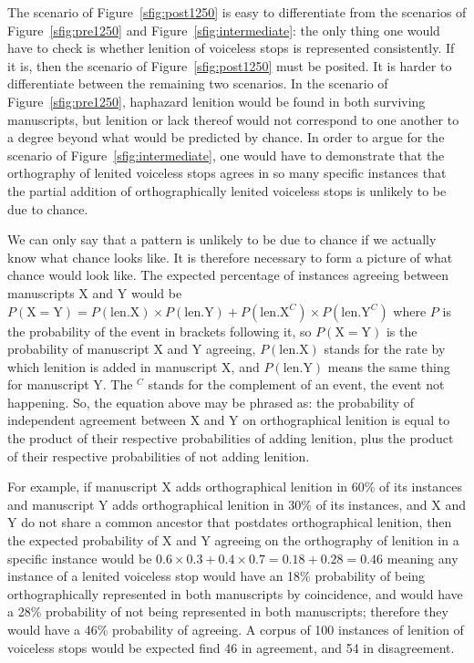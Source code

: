 The scenario of Figure~\ref{sfig:post1250} is easy to differentiate from the scenarios of Figure~\ref{sfig:pre1250} and Figure~\ref{sfig:intermediate}: the only thing one would have to check is whether lenition of voiceless stops is represented consistently. If it is, then the scenario of Figure~\ref{sfig:post1250} must be posited. It is harder to differentiate between the remaining two scenarios. In the scenario of Figure~\ref{sfig:pre1250}, haphazard lenition would be found in both surviving manuscripts, but lenition or lack thereof would not correspond to one another to a degree beyond what would be predicted by chance. In order to argue for the scenario of Figure~\ref{sfig:intermediate}, one would have to demonstrate that the orthography of lenited voiceless stops agrees in so many specific instances that the partial addition of orthographically lenited voiceless stops is unlikely to be due to chance.

We can only say that a pattern is unlikely to be due to chance if we actually know what chance looks like. It is therefore necessary to form a picture of what chance would look like. The expected percentage of instances agreeing between manuscripts X and Y would be 
\(P(\text{X} = \text{Y}) = P(\text{len.X}) \times P(\text{len.Y}) + P(\text{len.X}^C) \times P(\text{len.Y}^C)\)
where \(P\) is the probability of the event in brackets following it, so \(P(\text{X}=\text{Y})\) is the probability of manuscript X and Y agreeing, \(P(\text{len.X})\) stands for the rate by which lenition is added in manuscript X, and \(P(\text{len.Y})\) means the same thing for manuscript Y. The \(^C\) stands for the complement of an event, \ie the event not happening. So, the equation above may be phrased as: the probability of independent agreement between X and Y on orthographical lenition is equal to the product of their respective probabilities of adding lenition, plus the product of their respective probabilities of not adding lenition.

For example, if manuscript X adds orthographical lenition in 60\% of its instances and manuscript Y adds orthographical lenition in 30\% of its instances, and X and Y do not share a common ancestor that postdates orthographical lenition, then the expected probability of X and Y agreeing on the orthography of lenition in a specific instance would be
\(0.6 \times 0.3 + 0.4 \times 0.7= 0.18 + 0.28 = 0.46\)
meaning any instance of a lenited voiceless stop would have an 18\% probability of being orthographically represented in both manuscripts by coincidence, and would have a 28\% probability of not being represented in both manuscripts; therefore they would  have a 46\% probability of agreeing. A corpus of 100 instances of lenition of voiceless stops would be expected find 46 in agreement, and 54 in disagreement.

